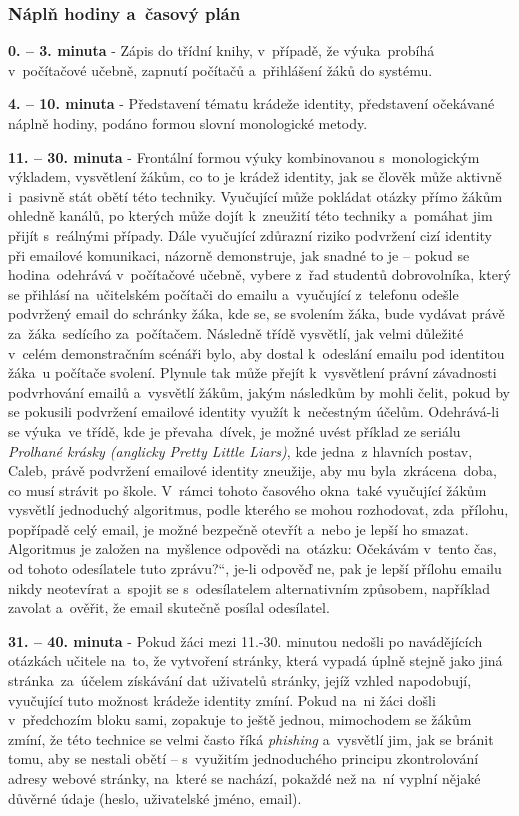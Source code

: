 \documentclass[a4paper, 12pt]{article}
\providecommand{\uv}[1]{\quotedblbase #1\textquotedblleft}
\begin{document}
\subsubsection{Náplň hodiny a~časový plán}
\indent\textbf{0. -- 3. minuta} - Zápis do třídní knihy, v~případě, že výuka~probíhá v~počítačové učebně, zapnutí počítačů a~přihlášení žáků do systému.

\textbf{4. -- 10. minuta} - Představení tématu krádeže identity, představení očekávané náplně hodiny, podáno formou slovní monologické metody.

\textbf{11. -- 30. minuta} - Frontální formou výuky kombinovanou s~monologickým výkladem, vysvětlení žákům, co to je krádež identity, jak se člověk může aktivně i~pasivně stát obětí této techniky. Vyučující může pokládat otázky přímo žákům ohledně kanálů, po kterých může dojít k~zneužití této techniky a~pomáhat jim přijít s~reálnými případy. Dále vyučující zdůrazní riziko podvržení cizí identity při emailové komunikaci, názorně demonstruje, jak snadné to je -- pokud se hodina~odehrává v~počítačové učebně, vybere z~řad studentů dobrovolníka, který se přihlásí na~učitelském počítači do emailu a~vyučující z~telefonu odešle podvržený email do schránky žáka, kde se, se svolením žáka, bude vydávat právě za~žáka~sedícího za~počítačem. Následně třídě vysvětlí, jak velmi důležité v~celém demonstračním scénáři bylo, aby dostal k~odeslání emailu pod identitou žáka~u počítače svolení. Plynule tak může přejít k~vysvětlení právní závadnosti podvrhování emailů a~vysvětlí žákům, jakým následkům by mohli čelit, pokud by se pokusili podvržení emailové identity využít k~nečestným účelům. Odehrává-li se výuka~ve třídě, kde je převaha~dívek, je možné uvést příklad ze seriálu \textit{Prolhané krásky (anglicky Pretty Little Liars)}, kde jedna~z hlavních postav, Caleb, právě podvržení emailové identity zneužije, aby mu byla~zkrácena~doba, co musí strávit po škole. V~rámci tohoto časového okna~také vyučující žákům vysvětlí jednoduchý algoritmus, podle kterého se mohou rozhodovat, zda~přílohu, popřípadě celý email, je možné bezpečně otevřít a~nebo je lepší ho smazat. Algoritmus je založen na~myšlence odpovědi na~otázku: \uv{Očekávám v~tento čas, od tohoto odesílatele tuto zprávu?}, je-li odpověď ne, pak je lepší přílohu emailu nikdy neotevírat a~spojit se s~odesílatelem alternativním způsobem, například zavolat a~ověřit, že email skutečně posílal odesílatel.

\textbf{31. -- 40. minuta} - Pokud žáci mezi 11.-30. minutou nedošli po navádějících otázkách učitele na~to, že vytvoření stránky, která vypadá úplně stejně jako jiná stránka~za~účelem získávání dat uživatelů stránky, jejíž vzhled napodobují, vyučující tuto možnost krádeže identity zmíní. Pokud na~ni žáci došli v~předchozím bloku sami, zopakuje to ještě jednou, mimochodem se žákům zmíní, že této technice se velmi často říká \textit{phishing} a~vysvětlí jim, jak se bránit tomu, aby se nestali obětí -- s~využitím jednoduchého principu zkontrolování adresy webové stránky, na~které se nachází, pokaždé než na~ní vyplní nějaké důvěrné údaje (heslo, uživatelské jméno, email).
\end{document}
